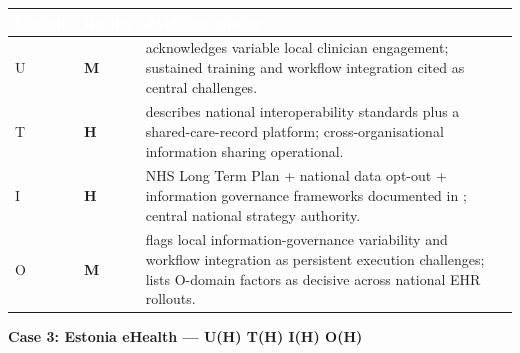 \begin{table}[H]
\footnotesize
\begin{tabular}{p{1.2cm} >{\centering\arraybackslash}p{1.4cm} p{12.5cm}}
\toprule
\rowcolor{headerblue}
\textcolor{white}{\textbf{Domain}} &
\textcolor{white}{\textbf{Rating}} &
\textcolor{white}{\textbf{Evidence anchor}} \\
\midrule
\rowcolor{rowgray}
U & \cellcolor{medamber}\textcolor{medambertext}{\textbf{M}} &
\cite{nhs2025sharedcare} acknowledges variable local clinician engagement; sustained training and workflow integration cited as central challenges. \\
T & \cellcolor{highgreen}\textcolor{highgreentext}{\textbf{H}} &
\cite{nhs2025sharedcare} describes national interoperability standards plus a shared-care-record platform; cross-organisational information sharing operational. \\
\rowcolor{rowgray}
I & \cellcolor{highgreen}\textcolor{highgreentext}{\textbf{H}} &
NHS Long Term Plan + national data opt-out + information governance frameworks documented in \cite{nhs2025sharedcare}; central national strategy authority. \\
O & \cellcolor{medamber}\textcolor{medambertext}{\textbf{M}} &
\cite{nhs2025sharedcare} flags local information-governance variability and workflow integration as persistent execution challenges; \cite{fennelly2020national} lists O-domain factors as decisive across national EHR rollouts. \\
\bottomrule
\end{tabular}
\end{table}

\medskip

\noindent\textbf{Case 3: Estonia eHealth --- U(H) T(H) I(H) O(H)}

